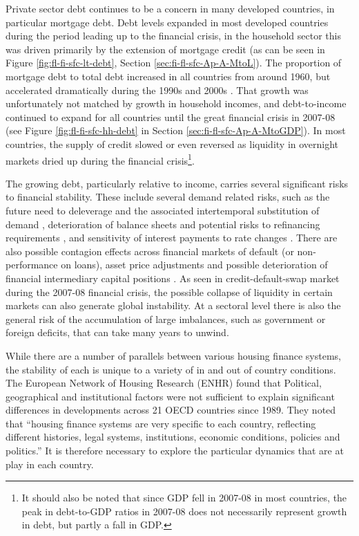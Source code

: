 \documentclass[
]{book}
\begin{document}
Private sector debt continues to be a concern in many developed countries, in particular mortgage debt. Debt levels expanded in most developed countries during the period leading up to the financial crisis, in the household sector this was driven primarily by the extension of mortgage credit (as can be seen in Figure \ref{fig:fl-fi-sfc-lt-debt}, Section \ref{sec:fi-fl-sfc-Ap-A-MtoL}). The proportion of mortgage debt to total debt increased in all countries from around 1960, but accelerated dramatically during the 1990s and 2000s \citep{jorda2017macrofinancial}. That growth was unfortunately not matched by growth in household incomes, and debt-to-income continued to expand for all countries until the great financial crisis in 2007-08 (see Figure \ref{fig:fl-fi-sfc-hh-debt} in Section \ref{sec:fi-fl-sfc-Ap-A-MtoGDP}). In most countries, the supply of credit slowed or even reversed as liquidity in overnight markets dried up during the financial crisis\footnote{It should also be noted that since GDP fell in 2007-08 in most countries, the peak in debt-to-GDP ratios in 2007-08 does not necessarily represent growth in debt, but partly a fall in GDP.}.

The growing debt, particularly relative to income, carries several significant risks to financial stability. These include several demand related risks, such as the future need to deleverage and the associated intertemporal substitution of demand \citep{Justiniano2015, Raberto2012, Seppecher2015}, deterioration of balance sheets and potential risks to refinancing requirements \citep{bernanke2007, scanlon2008, disyatat2011}, and sensitivity of interest payments to rate changes \citep{sheehy2014}. There are also possible contagion effects across financial markets of default (or non-performance on loans), asset price adjustments and possible deterioration of financial intermediary capital positions \citep{DanmarksNationalbank2016a}. As seen in credit-default-swap market during the 2007-08 financial crisis, the possible collapse of liquidity in certain markets can also generate global instability. At a sectoral level there is also the general risk of the accumulation of large imbalances, such as government or foreign deficits, that can take many years to unwind.

While there are a number of parallels between various housing finance systems, the stability of each is unique to a variety of in and out of country conditions. The European Network of Housing Research (ENHR) \citep{lunde2014introduction} found that Political, geographical and institutional factors were not sufficient to explain significant differences in developments across 21 OECD countries since 1989. They \citep[pp.~4]{lunde2014introduction} noted that ``housing finance systems are very specific to each country, reflecting different histories, legal systems, institutions, economic conditions, policies and politics.'' It is therefore necessary to explore the particular dynamics that are at play in each country.
\end{document}
